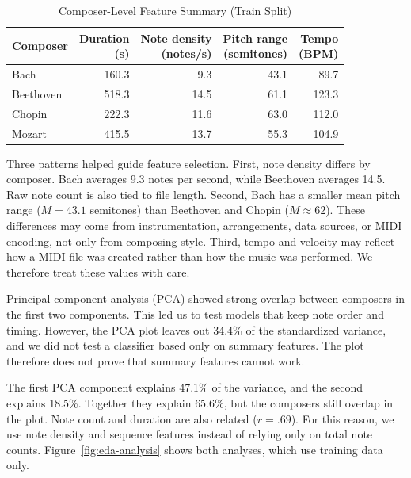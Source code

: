 \documentclass[stu, floatsintext]{apa7}
\begin{document}
\begin{table}[htbp]
  \centering
  \begin{threeparttable}
    \caption{Composer-Level Feature Summary (Train Split)}
    \label{tab:eda-summary}
    \begin{tabular}{@{}lrrrr@{}}
      \toprule
      Composer & \shortstack{Duration\\(s)} & \shortstack{Note density\\(notes/s)} & \shortstack{Pitch range\\(semitones)} & \shortstack{Tempo\\(BPM)} \\
      \midrule
      Bach      & 160.3 & 9.3  & 43.1 & 89.7  \\
      Beethoven & 518.3 & 14.5 & 61.1 & 123.3 \\
      Chopin    & 222.3 & 11.6 & 63.0 & 112.0 \\
      Mozart    & 415.5 & 13.7 & 55.3 & 104.9 \\
      \bottomrule
    \end{tabular}
  \end{threeparttable}
\end{table}

Three patterns helped guide feature selection. First, note density differs by
composer. Bach averages 9.3 notes per second, while Beethoven averages 14.5.
Raw note count is also tied to file length. Second, Bach has a smaller mean pitch
range ($M = 43.1$ semitones) than Beethoven and Chopin ($M \approx 62$). These
differences may come from instrumentation, arrangements, data sources, or MIDI
encoding, not only from composing style. Third, tempo and velocity may reflect
how a MIDI file was created rather than how the music was performed. We therefore
treat these values with care.

Principal component analysis (PCA) showed strong overlap between composers in
the first two components. This led us to test models that keep note order and
timing. However, the PCA plot leaves out 34.4\% of the standardized variance, and
we did not test a classifier based only on summary features. The plot therefore
does not prove that summary features cannot work.

The first PCA component explains 47.1\% of the variance, and the second explains
18.5\%. Together they explain 65.6\%, but the composers still overlap in the
plot. Note count and duration are also related ($r = .69$). For this reason, we
use note density and sequence features instead of relying only on total note
counts. Figure~\ref{fig:eda-analysis} shows both analyses, which use training
data only.
\end{document}
